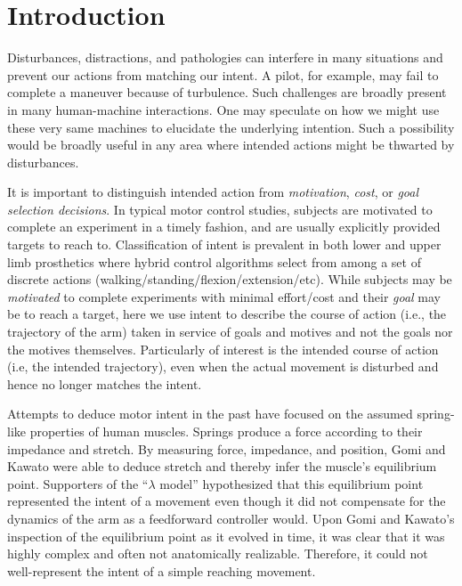 

\section*{Introduction}
Disturbances, distractions, and pathologies can interfere in many situations and prevent our actions from matching our intent. A pilot, for example, may fail to complete a maneuver because of turbulence. Such challenges are broadly present in many human-machine interactions. One may speculate on how we might use these very same machines to elucidate the underlying intention. Such a possibility would be broadly useful in any area where intended actions might be thwarted by disturbances. 

It is important to distinguish intended action from \textit{motivation}\cite{mcclelland1985motives, rawolle2013relationships}, \textit{cost}\cite{todorov2002optimal, flash1985coordination}, or \textit{goal selection decisions}\cite{ziebart2010modeling}. In typical motor control studies, subjects are motivated to complete an experiment in a timely fashion, and are usually explicitly provided targets to reach to. Classification of intent is prevalent in both lower \cite{strausser2011development, hargrove2013robotic} and upper limb\cite{englehart2003robust, young2012improving} prosthetics where hybrid control algorithms select from among a set of discrete actions (walking/standing/flexion/extension/etc). While subjects may be \textit{motivated} to complete experiments with minimal effort/cost and their \textit{goal} may be to reach a target, here we use intent to describe the course of action (i.e., the trajectory of the arm) taken in service of goals and motives and not the goals nor the motives themselves. Particularly of interest is the intended course of action (i.e, the intended trajectory), even when the actual movement is disturbed and hence no longer matches the intent.

Attempts to deduce motor intent in the past have focused on the assumed spring-like properties of human muscles. Springs produce a force according to their impedance and stretch. By measuring force, impedance, and position, Gomi and Kawato\cite{gomi1997human} were able to deduce stretch and thereby infer the muscle's equilibrium point. Supporters of the ``$\lambda$ model''\cite{feldman1995origin} hypothesized that this equilibrium point represented the intent of a movement even though it did not compensate for the dynamics of the arm as a feedforward controller would. Upon Gomi and Kawato's inspection of the equilibrium point as it evolved in time, it was clear that it was highly complex and often not anatomically realizable. Therefore, it could not well-represent the intent of a simple reaching movement. 

